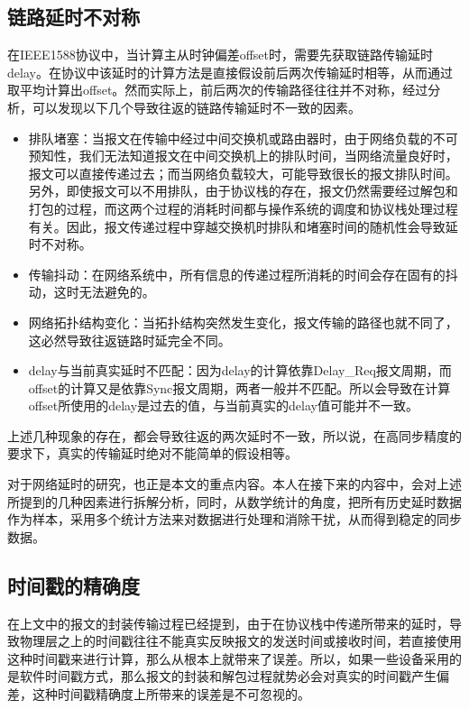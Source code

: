 \subsection{链路延时不对称}
\label{sec:1588_problem_1}
在IEEE1588协议中，当计算主从时钟偏差offset时，需要先获取链路传输延时delay。在协议中该延时的计算方法是直接假设前后两次传输延时相等，从而通过取平均计算出offset。然而实际上，前后两次的传输路径往往并不对称，经过分析，可以发现以下几个导致往返的链路传输延时不一致的因素\supercite{55}。
\begin{itemize}[noitemsep,topsep=0pt,parsep=0pt,partopsep=0pt]
	\item 排队堵塞：当报文在传输中经过中间交换机或路由器时，由于网络负载的不可预知性，我们无法知道报文在中间交换机上的排队时间，当网络流量良好时，报文可以直接传递过去；而当网络负载较大，可能导致很长的报文排队时间。另外，即使报文可以不用排队，由于协议栈的存在，报文仍然需要经过解包和打包的过程，而这两个过程的消耗时间都与操作系统的调度和协议栈处理过程有关。因此，报文传递过程中穿越交换机时排队和堵塞时间的随机性会导致延时不对称\supercite{46}。
	\item 传输抖动：在网络系统中，所有信息的传递过程所消耗的时间会存在固有的抖动，这时无法避免的。
	\item 网络拓扑结构变化：当拓扑结构突然发生变化，报文传输的路径也就不同了，这必然导致往返链路时延完全不同。
	\item delay与当前真实延时不匹配：因为delay的计算依靠Delay\_Req报文周期，而offset的计算又是依靠Sync报文周期，两者一般并不匹配。所以会导致在计算offset所使用的delay是过去的值，与当前真实的delay值可能并不一致。
\end{itemize}

上述几种现象的存在，都会导致往返的两次延时不一致，所以说，在高同步精度的要求下，真实的传输延时绝对不能简单的假设相等。

对于网络延时的研究，也正是本文的重点内容。本人在接下来的内容中，会对上述所提到的几种因素进行拆解分析，同时，从数学统计的角度，把所有历史延时数据作为样本，采用多个统计方法来对数据进行处理和消除干扰，从而得到稳定的同步数据。

\subsection{时间戳的精确度}
\label{sec:1588_problem_2}
在上文中的报文的封装传输过程已经提到，由于在协议栈中传递所带来的延时，导致物理层之上的时间戳往往不能真实反映报文的发送时间或接收时间，若直接使用这种时间戳来进行计算，那么从根本上就带来了误差\supercite{53}。所以，如果一些设备采用的是软件时间戳方式，那么报文的封装和解包过程就势必会对真实的时间戳产生偏差，这种时间戳精确度上所带来的误差是不可忽视的。

